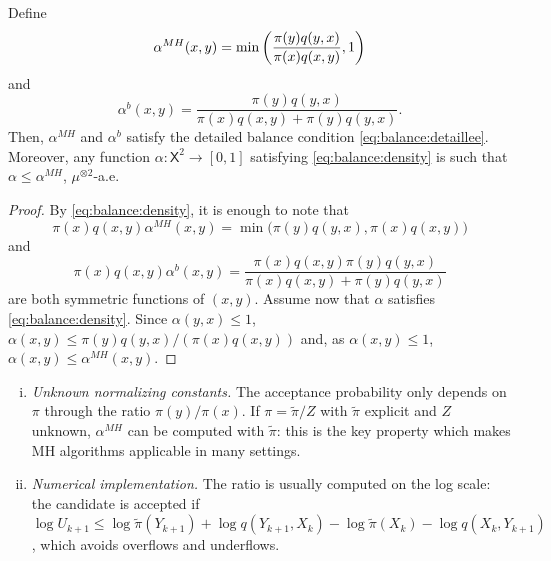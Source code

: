 \documentclass[english,graybox,envcountchap,envcountsame,sectrefs,shortlabels]{svmono}
\theoremstyle{style}
\newcommand{\Xset}{\mathsf{X}}
\begin{document}
\begin{lemma}
\label{lem:acceptance} Define
$$
\alpha^{MH}(x,y)=\min\left(\frac{\pi(y)q(y,x)}{\pi(x)q(x,y)},1\right)
$$
and
$$
\alpha^{b}(x,y)=\frac{\pi(y)q(y,x)}{\pi(x)q(x,y)+\pi(y)q(y,x)}.
$$
Then, $\alpha^{MH}$ and $\alpha^{b}$ satisfy
the detailed balance condition \eqref{eq:balance:detaillee}. Moreover, any function $\alpha:\Xset^2\to[0,1]$ satisfying \eqref{eq:balance:density} is such that $\alpha\leq\alpha^{MH}$, $\mu^{\otimes2}$-a.e.
\end{lemma}

\begin{proof}
By \eqref{eq:balance:density}, it is enough to note that
$$
\pi(x)q(x,y)\alpha^{MH}(x,y) = \min\big(\pi(y)q(y,x),\pi(x)q(x,y)\big)
$$
and
$$
\pi(x)q(x,y)\alpha^{b}(x,y) = \frac{\pi(x)q(x,y)\pi(y)q(y,x)}{\pi(x)q(x,y)+\pi(y)q(y,x)}
$$
are both symmetric functions of $(x,y)$. Assume now that $\alpha$ satisfies \eqref{eq:balance:density}. Since $\alpha(y,x)\leq1$,
$\alpha(x,y)\leq\pi(y)q(y,x)/(\pi(x)q(x,y))$ and, as $\alpha(x,y)\leq1$,
$\alpha(x,y)\leq\alpha^{MH}(x,y)$.
\end{proof}


\begin{remark}
\label{rem:mh:practical}
\begin{enumerate}[i)]
\item \emph{Unknown normalizing constants.} The acceptance probability only depends on $\pi$ through the ratio $\pi(y)/\pi(x)$. If $\pi = \tilde\pi/Z$ with $\tilde\pi$ explicit and $Z$ unknown, $\alpha^{MH}$ can be computed with $\tilde\pi$: this is the key property which makes MH algorithms applicable in many settings.
\item \emph{Numerical implementation.} The ratio is usually computed on the log scale: the candidate is accepted if $\log U_{k+1}\leq \log\tilde\pi(Y_{k+1})+\log q(Y_{k+1},X_k)-\log\tilde\pi(X_k)-\log q(X_k,Y_{k+1})$, which avoids overflows and underflows.
\end{enumerate}
\end{remark}
\end{document}
